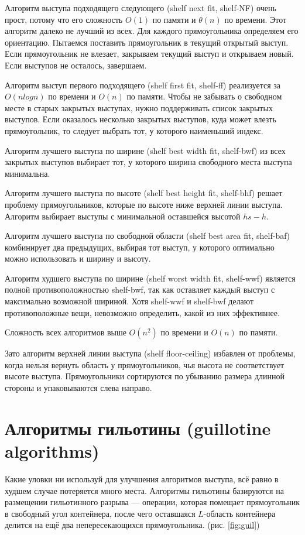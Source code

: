 \documentclass[a4paper,12pt]{report}
\begin{document}
Алгоритм выступа подходящего следующего (shelf next fit, shelf-NF) очень прост, потому что его сложность $O(1)$ по памяти и $\theta(n)$ по времени. Этот алгоритм далеко не лучший из всех. Для каждого прямоугольника определяем его ориентацию. Пытаемся поставить прямоугольник в текущий открытый выступ. Если прямоугольник не влезает, закрываем текущий выступ и открываем новый. Если выступов не осталось, завершаем.

Алгоритм выступ первого подходящего (shelf first fit, shelf-ff) реализуется за $O(nlogn)$ по времени и $O(n)$ по памяти. Чтобы не забывать о свободном месте в старых закрытых выступах, нужно поддерживать список закрытых выступов. Если оказалось несколько закрытых выступов, куда может влезть прямоугольник, то следует выбрать тот, у которого наименьший индекс.

Алгоритм лучшего выступа по ширине (shelf best width fit, shelf-bwf) из всех закрытых выступов выбирает тот, у которого ширина свободного места выступа минимальна.

Алгоритм лучшего выступа по высоте (shelf best height fit, shelf-bhf) решает проблему прямоугольников, которые по высоте ниже верхней линии выступа. Алгоритм выбирает выступы с минимальной оставшейся высотой $hs - h$.

Алгоритм лучшего выступа по свободной области (shelf best area fit, shelf-baf) комбинирует два предыдущих, выбирая тот выступ, у которого оптимально можно использовать и ширину и высоту.

Алгоритм худшего выступа по ширине (shelf worst width fit, shelf-wwf) является полной противоположностью shelf-bwf, так как оставляет каждый выступ с максимально возможной шириной. Хотя shelf-wwf и shelf-bwf делают противоположные вещи, невозможно определить, какой из них эффективнее.

Сложность всех алгоритмов выше $O(n^2)$ по времени и $O(n)$ по памяти.

Зато алгоритм верхней линии выступа (shelf floor-ceiling) избавлен от проблемы, когда нельзя вернуть область у прямоугольников, чья высота не соответствует высоте выступа. Прямоугольники сортируются по убыванию размера длинной стороны и упаковываются слева направо.

\section{Алгоритмы гильотины (guillotine algorithms)}

Какие уловки ни используй для улучшения алгоритмов выступа, всё равно в худшем случае потеряется много места. Алгоритмы гильотины базируются на размещении гильотинного разрыва — операции, которая помещает прямоугольник в свободный угол контейнера, после чего оставшаяся $L$-область контейнера делится на ещё два непересекающихся прямоугольника. (рис. \ref{fig:guil})
\end{document}
